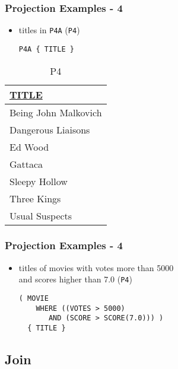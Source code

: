 \documentclass[dvipsnames]{beamer}
\theoremstyle{plain}
\begin{document}
\begin{frame}[fragile]
  \frametitle{Projection Examples - 4}

  \begin{itemize}
    \item titles in \texttt{P4A} (\texttt{P4})
    \begin{lstlisting}
P4A { TITLE }
    \end{lstlisting}
  \end{itemize}

  \vspace{-10pt}
  \begin{tiny}
  \begin{table}
    \caption{P4}
    \begin{tabular}{|l|}\hline
\underline{TITLE}   \\[2pt]\hline\hline
Being John Malkovich\\\hline
Dangerous Liaisons  \\\hline
Ed Wood             \\\hline
Gattaca             \\\hline
Sleepy Hollow       \\\hline
Three Kings         \\\hline
Usual Suspects      \\\hline
    \end{tabular}
  \end{table}
  \end{tiny}
\end{frame}

\begin{frame}[fragile]
  \frametitle{Projection Examples - 4}

  \begin{itemize}
    \item titles of movies with votes more than 5000\\
      and scores higher than 7.0 (\texttt{P4})
    \begin{lstlisting}
( MOVIE
    WHERE ((VOTES > 5000)
       AND (SCORE > SCORE(7.0))) )
  { TITLE }
    \end{lstlisting}
  \end{itemize}
\end{frame}

\subsection{Join}
\end{document}
